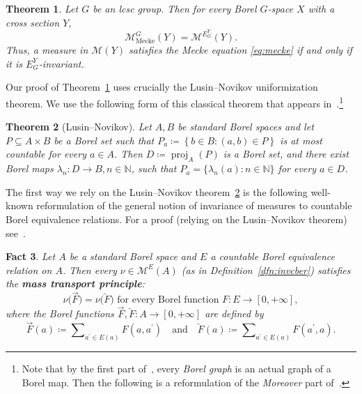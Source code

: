 \documentclass{amsart}
\numberwithin{equation}{subsection}
\newtheorem{thm}{Theorem}[section]
\newtheorem{fct}[thm]{Fact}
\theoremstyle{remark}
\begin{document}
\begin{thm}\label{thm:relativemecke}
Let \(G\) be an lcsc group. Then for every Borel \(G\)-space \(X\) with a cross section \(Y\),
\[\mathcal{M}_{\mathrm{Mecke}}^{G}\left(Y\right)=\mathcal{M}^{E_{G}^{Y}}\left(Y\right).\]
Thus, a measure in \(\mathcal{M}\left(Y\right)\) satisfies the Mecke equation \eqref{eq:mecke} if and only if it is \(E_{G}^{Y}\)-invariant.
\end{thm}

Our proof of Theorem~\ref{thm:relativemecke} uses crucially the Lusin--Novikov uniformization theorem. We use the following form of this classical theorem that appears in~\cite[Theorem (18.10)]{kechris2012classical}.\footnote{Note that by the first part of~\cite[Theorem (18.10)]{kechris2012classical}, every \emph{Borel graph} is an actual graph of a Borel map. Then the following is a reformulation of the \emph{Moreover} part of~\cite[Theorem (18.10)]{kechris2012classical}.}

\begin{thm}[Lusin--Novikov]\label{thm:lusinnovi}
Let \(A,B\) be standard Borel spaces and let \(P\subseteq A\times B\) be a Borel set such that \(P_{a}\coloneqq\left\{b\in B:\left(a,b\right)\in P\right\}\) is at most countable for every \(a\in A\). Then \(D\coloneqq\operatorname{proj}_{A}\left(P\right)\) is a Borel set, and there exist Borel maps \(\lambda_{n}:D\to B, n\in\mathbb{N}\), such that \(P_{a}=\{\lambda_{n}\left(a\right):n\in\mathbb{N}\}\) for every \(a\in D\).
\end{thm}

The first way we rely on the Lusin--Novikov theorem~\ref{thm:lusinnovi} is the following well-known reformulation of the general notion of invariance of measures to countable Borel equivalence relations. For a proof (relying on the Lusin--Novikov theorem)  see~\cite[\S8]{kechris2004topics}.

\begin{fct}\label{fct:mtp}
Let \(A\) be a standard Borel space and \(E\) a countable Borel equivalence relation on \(A\). Then every \(\nu\in\mathcal{M}^{E}\left(A\right)\) (as in Definition~\ref{dfn:invcber}) satisfies the {\bf mass transport principle}:
\[\nu\big(\overrightarrow{F}\big)=\nu\big(\overleftarrow{F}\big)\text{ for every Borel function }F:E\to\left[0,+\infty\right],\]
where the Borel functions \(\overrightarrow{F},\overleftarrow{F}:A\to\left[0,+\infty\right]\) are defined by
\[\overrightarrow{F}\left(a\right)\coloneqq\sum\nolimits_{a^{\prime}\in E\left(a\right)}F\left(a,a^{\prime}\right)\quad\text{and}\quad\overleftarrow{F}\left(a\right)\coloneqq\sum\nolimits_{a^{\prime}\in E\left(a\right)}F\left(a^{\prime},a\right).\]
\end{fct}
\end{document}
